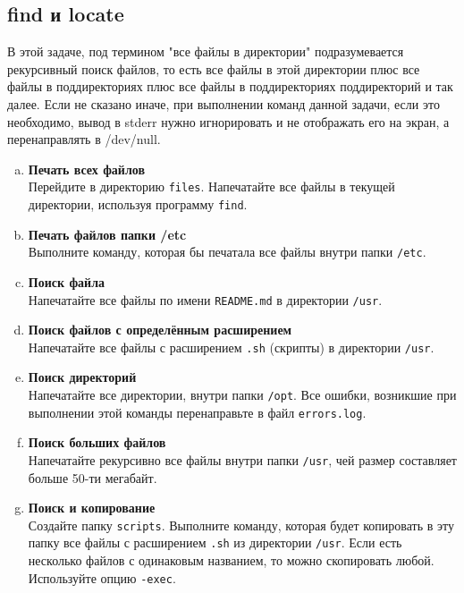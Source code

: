 \documentclass{article}
\begin{document}
\subsection{find и locate}
В этой задаче, под термином "все файлы в директории"{} подразумевается рекурсивный поиск файлов, то есть все файлы в этой директории плюс все файлы в поддиректориях плюс все файлы в поддиректориях поддиректорий и так далее. Если не сказано иначе, при выполнении команд данной задачи, если это необходимо, вывод в stderr нужно игнорировать и не отображать его на экран, а перенаправлять в /dev/null.

\begin{enumerate}[a.]
\item \textbf{Печать всех файлов}\\
Перейдите в директорию \texttt{files}. Напечатайте все файлы в текущей директории, используя программу \texttt{find}.

\item \textbf{Печать файлов папки /etc}\\
Выполните команду, которая бы печатала все файлы внутри папки \texttt{/etc}.

\item \textbf{Поиск файла}\\
Напечатайте все файлы по имени \texttt{README.md} в директории \texttt{/usr}.

\item \textbf{Поиск файлов с определённым расширением}\\
Напечатайте все файлы с расширением \texttt{.sh} (скрипты) в директории \texttt{/usr}.

\item \textbf{Поиск директорий}\\
Напечатайте все директории, внутри папки \texttt{/opt}. Все ошибки, возникшие при выполнении этой команды перенаправьте в файл \texttt{errors.log}.

\item \textbf{Поиск больших файлов}\\
Напечатайте рекурсивно все файлы внутри папки \texttt{/usr}, чей размер составляет больше 50-ти мегабайт.

\item \textbf{Поиск и копирование}\\
Создайте папку \texttt{scripts}. Выполните команду, которая будет копировать в эту папку все файлы с расширением \texttt{.sh} из директории \texttt{/usr}. Если есть несколько файлов с одинаковым названием, то можно скопировать любой. Используйте опцию \texttt{-exec}.


\end{enumerate}
\end{document}
